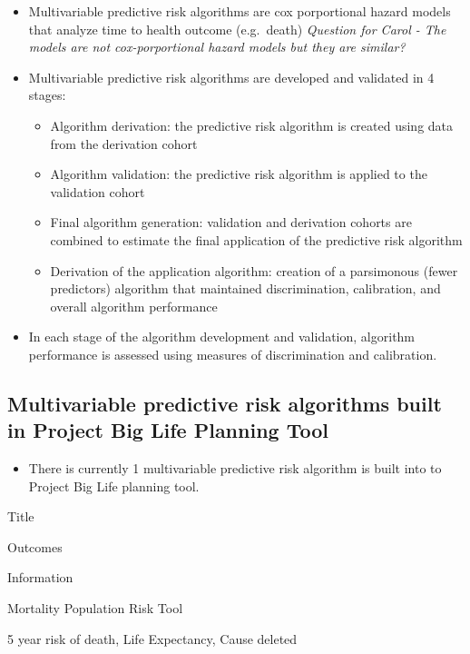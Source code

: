 \documentclass[]{book}
\providecommand{\tightlist}{%
  \setlength{\itemsep}{0pt}\setlength{\parskip}{0pt}}
\begin{document}
\begin{itemize}
\item
  Multivariable predictive risk algorithms are cox porportional hazard
  models that analyze time to health outcome (e.g.~death) \emph{Question
  for Carol - The models are not cox-porportional hazard models but they
  are similar?}
\item
  Multivariable predictive risk algorithms are developed and validated
  in 4 stages:

  \begin{itemize}
  \tightlist
  \item
    Algorithm derivation: the predictive risk algorithm is created using
    data from the derivation cohort
  \item
    Algorithm validation: the predictive risk algorithm is applied to
    the validation cohort
  \item
    Final algorithm generation: validation and derivation cohorts are
    combined to estimate the final application of the predictive risk
    algorithm
  \item
    Derivation of the application algorithm: creation of a parsimonous
    (fewer predictors) algorithm that maintained discrimination,
    calibration, and overall algorithm performance
  \end{itemize}
\item
  In each stage of the algorithm development and validation, algorithm
  performance is assessed using measures of discrimination and
  calibration.
\end{itemize}

\subsection{Multivariable predictive risk algorithms built in Project
Big Life Planning
Tool}\label{multivariable-predictive-risk-algorithms-built-in-project-big-life-planning-tool}

\begin{itemize}
\tightlist
\item
  There is currently 1 multivariable predictive risk algorithm is built
  into to Project Big Life planning tool.
\end{itemize}

Title

Outcomes

Information

Mortality Population Risk Tool

5 year risk of death, Life Expectancy, Cause deleted
\end{document}
